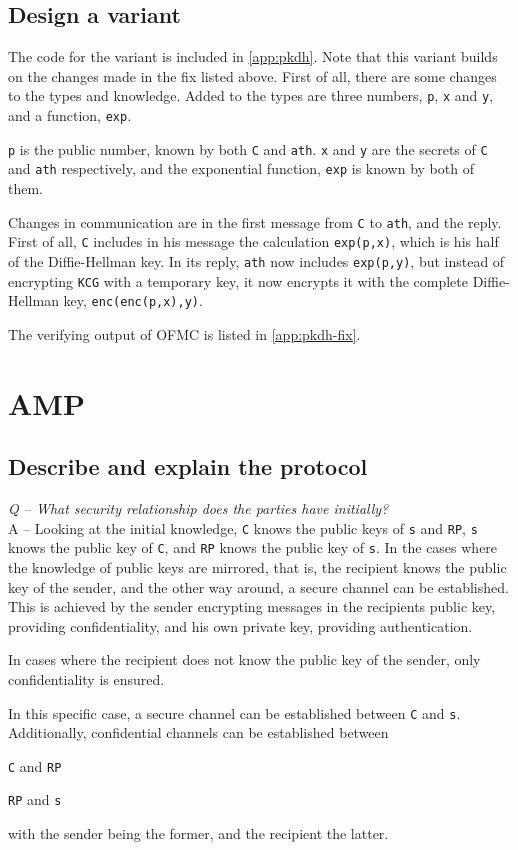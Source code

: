 \documentclass{article}
\newcommand\Q[1]{
	\leavevmode\par
	\noindent
	\emph{Q -- #1}
	\\
}
\newcommand\A[1]{
	A -- #1
}
\begin{document}
\subsection{Design a variant}
The code for the variant is included in \ref{app:pkdh}.
Note that this variant builds on the changes made in the fix listed above.
First of all, there are some changes to the types and knowledge.
Added to the types are three numbers, \texttt{p}, \texttt{x} and \texttt{y},
and a function, \texttt{exp}.

\texttt{p} is the public number, known by both \texttt{C} and \texttt{ath}.
\texttt{x} and \texttt{y} are the secrets of \texttt{C} and \texttt{ath} respectively,
and the exponential function, \texttt{exp} is known by both of them.

Changes in communication are in the first message from \texttt{C} to \texttt{ath},
and the reply.
First of all, \texttt{C} includes in his message the calculation \texttt{exp(p,x)},
which is his half of the Diffie-Hellman key.
In its reply, \texttt{ath} now includes \texttt{exp(p,y)},
but instead of encrypting \texttt{KCG} with a temporary key,
it now encrypts it with the complete Diffie-Hellman key,
\texttt{enc(enc(p,x),y)}.

The verifying output of OFMC is listed in \ref{app:pkdh-fix}.

\section{AMP}

\subsection{Describe and explain the protocol}

\Q{What security relationship does the parties have initially?}
\A{
	Looking at the initial knowledge, \texttt{C} knows the public keys
	of \texttt{s} and \texttt{RP}, \texttt{s} knows the public key of \texttt{C},
	and \texttt{RP} knows the public key of \texttt{s}.
	In the cases where the knowledge of public keys are mirrored, that is, the recipient
	knows the public key of the sender, and the other way around, a secure channel can be
	established. This is achieved by the sender encrypting messages in the recipients
	public key, providing confidentiality, and his own private key, providing authentication.
	
	In cases where the recipient does not know the public key of the sender,
	only confidentiality is ensured.

	In this specific case, a secure channel can be established between \texttt{C} and \texttt{s}.
	Additionally, confidential channels can be established between
	\begin{itemize*}
		\item \texttt{C} and \texttt{RP}
		\item \texttt{RP} and \texttt{s}
	\end{itemize*}
	with the sender being the former, and the recipient the latter.
}
\end{document}
